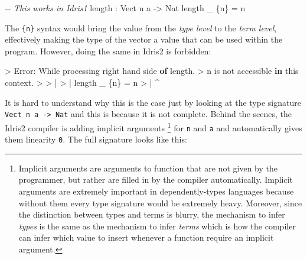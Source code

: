 \documentclass[
]{article}
\newenvironment{Shaded}{}{}
\newcommand{\CommentTok}[1]{\textcolor[rgb]{0.38,0.63,0.69}{\textit{#1}}}
\newcommand{\DataTypeTok}[1]{\textcolor[rgb]{0.56,0.13,0.00}{#1}}
\newcommand{\FunctionTok}[1]{\textcolor[rgb]{0.02,0.16,0.49}{#1}}
\newcommand{\KeywordTok}[1]{\textcolor[rgb]{0.00,0.44,0.13}{\textbf{#1}}}
\newcommand{\NormalTok}[1]{#1}
\newcommand{\OperatorTok}[1]{\textcolor[rgb]{0.40,0.40,0.40}{#1}}
\newcommand{\OtherTok}[1]{\textcolor[rgb]{0.00,0.44,0.13}{#1}}
\begin{document}
\begin{Shaded}
\begin{Highlighting}[]
\CommentTok{{-}{-} This works in Idris1}
\FunctionTok{length} \OperatorTok{:} \DataTypeTok{Vect}\NormalTok{ n a }\OtherTok{{-}\textgreater{}} \DataTypeTok{Nat}
\FunctionTok{length}\NormalTok{ \_ \{n\} }\OtherTok{=}\NormalTok{ n}
\end{Highlighting}
\end{Shaded}

The \texttt{\{n\}} syntax would bring the value from the \emph{type
level} to the \emph{term level}, effectively making the type of the
vector a value that can be used within the program. However, doing the
same in Idris2 is forbidden:

\begin{Shaded}
\begin{Highlighting}[]
\OperatorTok{\textgreater{}} \DataTypeTok{Error}\OperatorTok{:} \DataTypeTok{While}\NormalTok{ processing right hand side }\KeywordTok{of} \FunctionTok{length}\OperatorTok{.} 
\OperatorTok{\textgreater{}}\NormalTok{   n is }\FunctionTok{not}\NormalTok{ accessible }\KeywordTok{in}\NormalTok{ this context}\OperatorTok{.}
\OperatorTok{\textgreater{}} 
\OperatorTok{\textgreater{}}     \OperatorTok{|}
\OperatorTok{\textgreater{}}     \OperatorTok{|} \FunctionTok{length}\NormalTok{ \_ \{n\} }\OtherTok{=}\NormalTok{ n}
\OperatorTok{\textgreater{}}     \OperatorTok{|}                \OperatorTok{\^{}}
\end{Highlighting}
\end{Shaded}

It is hard to understand why this is the case just by looking at the
type signature \texttt{Vect\ n\ a\ -\textgreater{}\ Nat} and this is
because it is not complete. Behind the scenes, the Idris2 compiler is
adding implicit arguments \footnote{Implicit arguments are arguments to
  function that are not given by the programmer, but rather are filled
  in by the compiler automatically. Implicit arguments are extremely
  important in dependently-types languages because without them every
  type signature would be extremely heavy. Moreover, since the
  distinction between types and terms is blurry, the mechanism to infer
  \emph{types} is the same as the mechanism to infer \emph{terms} which
  is how the compiler can infer which value to insert whenever a
  function require an implicit argument.} for \texttt{n} and \texttt{a}
and automatically gives them linearity \texttt{0}. The full signature
looks like this:
\end{document}
